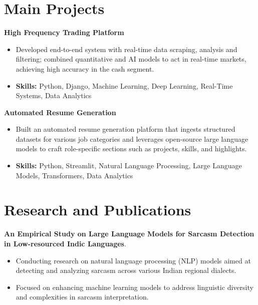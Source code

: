\documentclass[a4paper,11pt]{article}
\begin{document}
\section{\textbf{Main Projects}}

\vspace{1mm}
  \textbf{High Frequency Trading Platform  }
\vspace{-1.5mm} %
\begin{itemize}
  \item Developed end-to-end system with real-time data scraping, analysis and filtering; combined quantitative and AI models to act in real-time markets, achieving high accuracy in the cash segment.
\vspace{-3mm}
  \item \textbf{Skills:} Python, Django, Machine Learning, Deep Learning, Real-Time Systems, Data Analytics
\end{itemize}


\vspace{1mm}
   \textbf{Automated Resume Generation }
\vspace{-1.5mm} %
\begin{itemize}
  \item Built an automated resume generation platform that ingests structured datasets for various job categories and leverages open-source large language models to craft role-specific sections such as projects, skills, and highlights.
\vspace{-3mm}
  \item \textbf{Skills:} Python, Streamlit, Natural Language Processing, Large Language Models, Transformers, Data Analytics
\end{itemize}



\section{\textbf{Research and Publications} \hfill }
\vspace{1mm}
  \textbf{An Empirical Study on Large Language Models for Sarcasm Detection in Low-resourced Indic Languages}.
\vspace{-1mm} %
\begin{itemize}
  \item Conducting research on natural language processing (NLP) models aimed at detecting and analyzing sarcasm across various Indian regional dialects.
\vspace{-3mm}
  \item Focused on enhancing machine learning models to address linguistic diversity and complexities in sarcasm interpretation.
\end{itemize}
\end{document}

